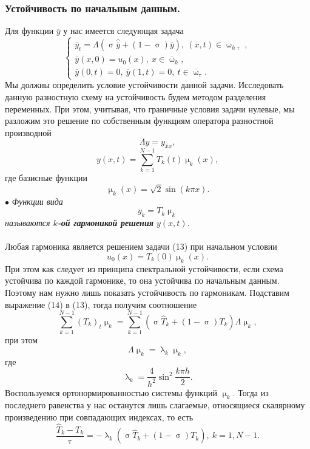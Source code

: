 \documentclass[a4paper, 12pt]{report}
\numberwithin{equation}{section}
\newcommand{\ol}{\overline}
\renewcommand{\tau}{\uptau}
\renewcommand{\lambda}{\uplambda}
\renewcommand{\sigma}{\upsigma}
\renewcommand{\mu}{\upmu}
\renewcommand{\omega}{\upomega}
\begin{document}
		\subsubsection{Устойчивость по начальным данным.}
		Для функции $\ol y$ у нас имеется следующая задача
		\begin{equation}
			\begin{cases}
				\ol y_t = \Lambda(\sigma \hat{\ol{ y}} + (1-\sigma)\ol y),\ (x,t)\in \omega_{h\tau},\\
				\ol y(x,0) = u_0(x),\ x \in \ol \omega_h,\\
				\ol y(0, t) = 0,\ \ol y(1,t) = 0,\ t \in \ol \omega_\tau.
			\end{cases}
		\end{equation}
		Мы должны определить условие устойчивости данной задачи. Исследовать данную разностную схему на устойчивость будем методом разделения переменных. При этом, учитывая, что граничные условия задачи нулевые, мы разложим это решение по собственным функциям оператора разностной производной
		$$\Lambda y = y_{\ol x x},$$
		\begin{equation}
			y(x,t) = \sum_{k=1}^{N-1}T_k(t)\mu_k(x),
		\end{equation}
		где базисные функции \begin{equation*}
			\mu_k(x) = \sqrt 2 \sin (k \pi x).
		\end{equation*}
		$\bullet$ \textit{Функции вида $$y_k = T_k \mu _k$$ называются \textbf{$k$-ой гармоникой решения} $y(x,t)$.}\\\\
		Любая гармоника является решением задачи (13) при начальном условии $$u_0(x)= T_k(0)\mu_k(x).$$
		При этом как следует из принципа спектральной устойчивости, если схема устойчива по каждой гармонике, то она устойчива по начальным данным. Поэтому нам нужно лишь показать устойчивость по гармоникам. Подставим выражение (14) в (13), тогда получим соотношение
		\begin{equation*}
			\sum_{k=1}^{N-1} (T_k)_t \mu_k = \sum_{k=1}^{N-1} (\sigma \hat T_k + (1-\sigma)T_k)\Lambda \mu_k,
		\end{equation*}
		при этом
		$$\Lambda \mu_k = \lambda_k \mu _k,$$
		где $$\lambda_k = \dfrac{4}{h^2}\sin^2 \dfrac{k\pi h}{2}.$$
		Воспользуемся ортонормированностью системы функций $\mu_k$. Тогда из последнего равенства у нас останутся лишь слагаемые, относящиеся скалярному произведению при совпадающих индексах, то есть
		$$\dfrac{\hat T_k - T_k}{\tau} = -\lambda_k (\sigma \hat T_k + (1-\sigma)T_k),\ k=\overline{1, N-1}.$$
\end{document}
